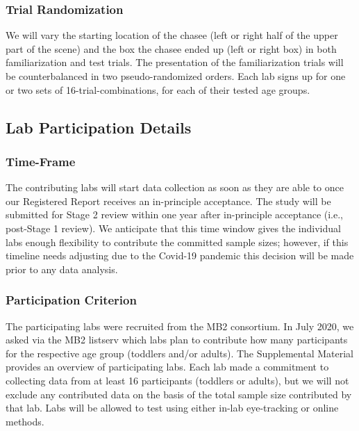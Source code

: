 \documentclass[
  man,floatsintext]{apa6}
\begin{document}
\subsubsection{Trial Randomization}\label{trial-randomization}

We will vary the starting location of the chasee (left or right half of the upper part of the scene) and the box the chasee ended up (left or right box) in both familiarization and test trials. The presentation of the familiarization trials will be counterbalanced in two pseudo-randomized orders. Each lab signs up for one or two sets of 16-trial-combinations, for each of their tested age groups.

\subsection{Lab Participation Details}\label{lab-participation-details}

\subsubsection{Time-Frame}\label{time-frame}

The contributing labs will start data collection as soon as they are able to once our Registered Report receives an in-principle acceptance. The study will be submitted for Stage 2 review within one year after in-principle acceptance (i.e., post-Stage 1 review). We anticipate that this time window gives the individual labs enough flexibility to contribute the committed sample sizes; however, if this timeline needs adjusting due to the Covid-19 pandemic this decision will be made prior to any data analysis.

\subsubsection{Participation Criterion}\label{participation-criterion}

The participating labs were recruited from the MB2 consortium. In July 2020, we asked via the MB2 listserv which labs plan to contribute how many participants for the respective age group (toddlers and/or adults). The Supplemental Material provides an overview of participating labs. Each lab made a commitment to collecting data from at least 16 participants (toddlers or adults), but we will not exclude any contributed data on the basis of the total sample size contributed by that lab. Labs will be allowed to test using either in-lab eye-tracking or online methods.
\end{document}
